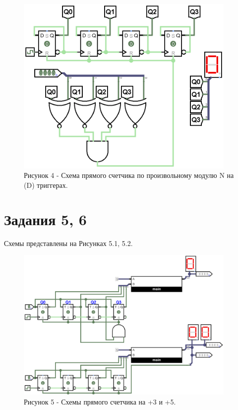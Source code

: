 \documentclass[oneside,a4paper,14pt]{extarticle}
\begin{document}
\begin{figure}[h!]
	\centering
	\includegraphics[width=0.95\textwidth]{pics/4.png}
	\caption*{Рисунок 4 - Схема прямого счетчика по произвольному модулю N на (D) триггерах.}
\end{figure}
\newpage

\section*{Задания 5, 6}

\noindent Схемы представлены на Рисунках 5.1, 5.2.\\
\begin{figure}[h!]
	\centering
	\includegraphics[width=0.95\textwidth]{pics/5.png}
	\caption*{Рисунок 5 - Схемы прямого счетчика на +3 и +5.}
\end{figure}
\end{document}
